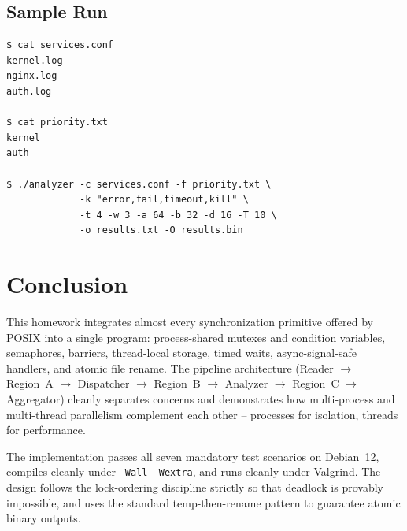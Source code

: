 \documentclass[11pt,a4paper]{article}
\newcommand{\code}[1]{\texttt{\small #1}}
\begin{document}
\subsection{Sample Run}

\begin{lstlisting}[style=Bashstyle]
$ cat services.conf
kernel.log
nginx.log
auth.log

$ cat priority.txt
kernel
auth

$ ./analyzer -c services.conf -f priority.txt \
             -k "error,fail,timeout,kill" \
             -t 4 -w 3 -a 64 -b 32 -d 16 -T 10 \
             -o results.txt -O results.bin
\end{lstlisting}

\section{Conclusion}

This homework integrates almost every synchronization primitive offered
by POSIX into a single program: process-shared mutexes and condition
variables, semaphores, barriers, thread-local storage, timed waits,
async-signal-safe handlers, and atomic file rename. The pipeline
architecture (Reader $\to$ Region~A $\to$ Dispatcher $\to$ Region~B
$\to$ Analyzer $\to$ Region~C $\to$ Aggregator) cleanly separates
concerns and demonstrates how multi-process and multi-thread
parallelism complement each other -- processes for isolation, threads
for performance.

The implementation passes all seven mandatory test scenarios on
Debian~12, compiles cleanly under \code{-Wall -Wextra}, and runs
cleanly under Valgrind. The design follows the lock-ordering discipline
strictly so that deadlock is provably impossible, and uses the
standard temp-then-rename pattern to guarantee atomic binary outputs.
\end{document}
